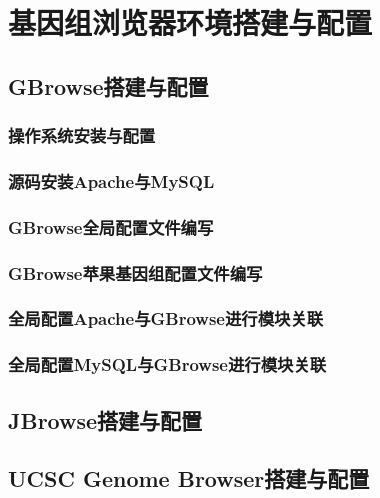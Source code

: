 \chapter{基因组浏览器环境搭建与配置}
	\section{GBrowse搭建与配置}
	\subsection{操作系统安装与配置}
	\subsection{源码安装Apache与MySQL}
	\subsection{GBrowse全局配置文件编写}
	\subsection{GBrowse苹果基因组配置文件编写}
	\subsection{全局配置Apache与GBrowse进行模块关联}
	\subsection{全局配置MySQL与GBrowse进行模块关联}
	\section{JBrowse搭建与配置}
	\section{UCSC Genome Browser搭建与配置}